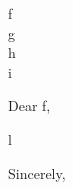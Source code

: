 \documentclass[11pt]{letter}
\newcommand{\recipient}{f}
\newcommand{\company}{g}
\newcommand{\companyaddress}{h}
\newcommand{\companycity}{i}
\newcommand{\letterdate}{k}
\begin{document}
\begin{letter}{\recipient \\ \company \\ \companyaddress \\ \companycity}
\date{\letterdate}

\opening{Dear \recipient,}

l

\closing{Sincerely,}

\end{letter}
\end{document}
